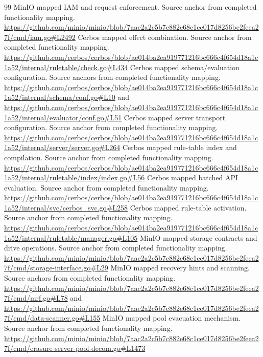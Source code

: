 \documentclass[11pt,a4paper]{article}
\begin{document}

\begin{thebibliography}{99}
\small
{} MinIO mapped IAM and request enforcement. Source anchor from completed functionality mapping. \url{https://github.com/minio/minio/blob/7aac2a2c5b7c882e68c1ce017d8256be2feea27f/cmd/iam.go#L2492}
 Cerbos mapped effect combination. Source anchor from completed functionality mapping. \url{https://github.com/cerbos/cerbos/blob/ae014ba2ea919771216bc666c4f654d18a1c1a52/internal/ruletable/check.go#L434}
 Cerbos mapped schema/evaluation configuration. Source anchors from completed functionality mapping. \url{https://github.com/cerbos/cerbos/blob/ae014ba2ea919771216bc666c4f654d18a1c1a52/internal/schema/conf.go#L10} and \url{https://github.com/cerbos/cerbos/blob/ae014ba2ea919771216bc666c4f654d18a1c1a52/internal/evaluator/conf.go#L51}
 Cerbos mapped server transport configuration. Source anchor from completed functionality mapping. \url{https://github.com/cerbos/cerbos/blob/ae014ba2ea919771216bc666c4f654d18a1c1a52/internal/server/server.go#L264}
 Cerbos mapped rule-table index and compilation. Source anchor from completed functionality mapping. \url{https://github.com/cerbos/cerbos/blob/ae014ba2ea919771216bc666c4f654d18a1c1a52/internal/ruletable/index/index.go#L56}
 Cerbos mapped batched API evaluation. Source anchor from completed functionality mapping. \url{https://github.com/cerbos/cerbos/blob/ae014ba2ea919771216bc666c4f654d18a1c1a52/internal/svc/cerbos_svc.go#L258}
 Cerbos mapped rule-table activation. Source anchor from completed functionality mapping. \url{https://github.com/cerbos/cerbos/blob/ae014ba2ea919771216bc666c4f654d18a1c1a52/internal/ruletable/manager.go#L105}
 MinIO mapped storage contracts and drive operations. Source anchor from completed functionality mapping. \url{https://github.com/minio/minio/blob/7aac2a2c5b7c882e68c1ce017d8256be2feea27f/cmd/storage-interface.go#L29}
 MinIO mapped recovery hints and scanning. Source anchors from completed functionality mapping. \url{https://github.com/minio/minio/blob/7aac2a2c5b7c882e68c1ce017d8256be2feea27f/cmd/mrf.go#L78} and \url{https://github.com/minio/minio/blob/7aac2a2c5b7c882e68c1ce017d8256be2feea27f/cmd/data-scanner.go#L155}
 MinIO mapped pool evacuation mechanism. Source anchor from completed functionality mapping. \url{https://github.com/minio/minio/blob/7aac2a2c5b7c882e68c1ce017d8256be2feea27f/cmd/erasure-server-pool-decom.go#L1473}

\end{thebibliography}
\end{document}

